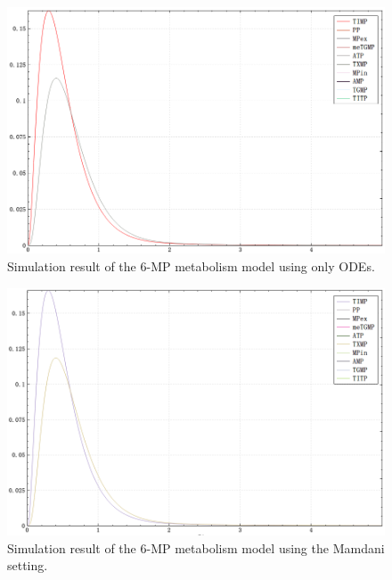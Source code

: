\documentclass[journal,a4paper,onecolumn]{article}
\begin{document}
\begin{figure}[!hbt]
	\begin{center}
		\includegraphics[width=\columnwidth]{fig54}
		\caption{Simulation result of the 6-MP metabolism model using only ODEs.}
		\label{fig:Simulation result of 6-MP metabolism using only ODEs.}
	\end{center}
\end{figure}

\begin{figure}[!hbt]
	\begin{center}
		\includegraphics[width=\columnwidth]{fig55}
		\caption{Simulation result of the 6-MP metabolism model using the Mamdani setting.}
		\label{fig:Simulation result of 6-MP metabolism using Mamdani.}
	\end{center}
\end{figure}
\end{document}
